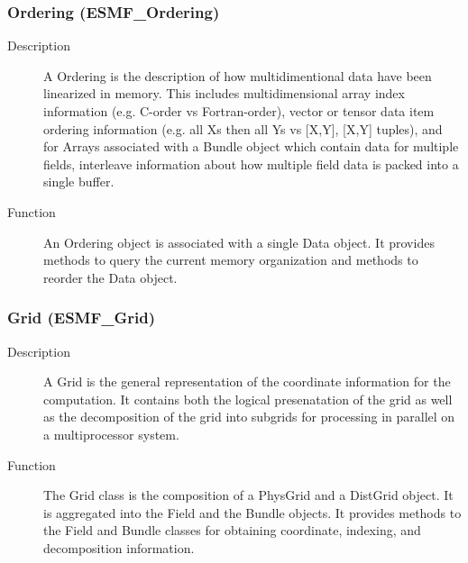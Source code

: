 \subsubsection{Ordering (ESMF\_Ordering)}
\label{sec:ordering} 
\begin{description}
\item [Description] A Ordering is the description of how multidimentional data have been
linearized in memory.  This includes multidimensional array index information (e.g. C-order
vs Fortran-order), vector or tensor data item ordering information (e.g. all Xs then all
Ys vs [X,Y], [X,Y] tuples), and for Arrays associated with a Bundle object which contain
data for multiple fields, interleave information about how multiple field data is 
packed into a single buffer.
\item [Function] An Ordering object is associated with a single Data object.  It provides
methods to query the current memory organization and methods to reorder the Data object.
\end{description}

\subsubsection{Grid (ESMF\_Grid)}
\label{sec:ordering} 
\begin{description}
\item [Description] A Grid is the general representation of the coordinate information for
the computation.  It contains both the logical presenatation of the grid as well as the
decomposition of the grid into subgrids for processing in parallel on a
multiprocessor system.
\item [Function] The Grid class is the composition of a PhysGrid and a DistGrid object.  
It is aggregated into the Field and the Bundle objects.  It provides methods to the
Field and Bundle classes for obtaining coordinate, indexing, and decomposition information.
\end{description}

